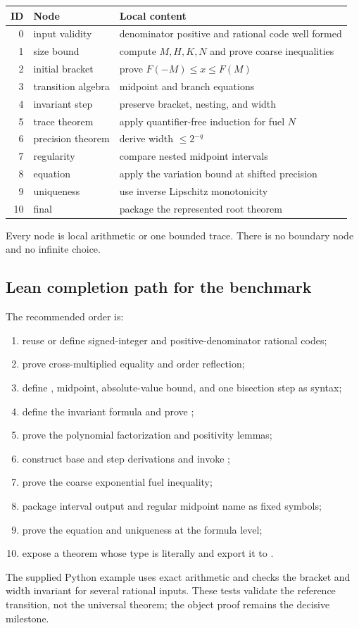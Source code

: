 \begin{longtable}{r p{} p{}}
\toprule
ID & Node & Local content \\
\midrule
\endhead
0 & input validity & denominator positive and rational code well formed \\
1 & size bound & compute \(M,H,K,N\) and prove coarse inequalities \\
2 & initial bracket & prove \(F(-M)\le x\le F(M)\) \\
3 & transition algebra & midpoint and branch equations \\
4 & invariant step & preserve bracket, nesting, and width \\
5 & trace theorem & apply quantifier-free induction for fuel \(N\) \\
6 & precision theorem & derive width \(\le2^{-q}\) \\
7 & regularity & compare nested midpoint intervals \\
8 & equation & apply the variation bound at shifted precision \\
9 & uniqueness & use inverse Lipschitz monotonicity \\
10 & final & package the represented root theorem \\
\bottomrule
\end{longtable}

Every node is local arithmetic or one bounded trace.  There is no boundary node and no infinite choice.

\subsection{Lean completion path for the benchmark}

The recommended order is:

\begin{enumerate}
\item reuse or define signed-integer and positive-denominator rational codes;
\item prove cross-multiplied equality and order reflection;
\item define , midpoint, absolute-value bound, and one bisection step as  syntax;
\item define the invariant formula and prove ;
\item prove the polynomial factorization and positivity lemmas;
\item construct base and step derivations and invoke ;
\item prove the coarse exponential fuel inequality;
\item package interval output and regular midpoint name as fixed  symbols;
\item prove the equation and uniqueness at the formula level;
\item expose a theorem whose type is literally  and export it to .
\end{enumerate}

The supplied Python example uses exact  arithmetic and checks the bracket and width invariant for several rational inputs.  These tests validate the reference transition, not the universal theorem; the object proof remains the decisive milestone.
